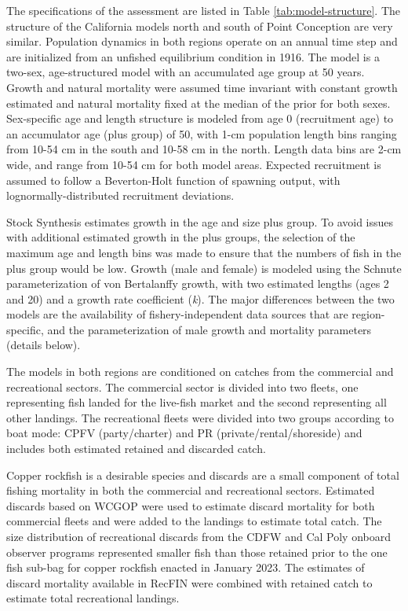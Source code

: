 \documentclass[11pt,
  letterpaper,
]{article}
\begin{document}
The specifications of the assessment are listed in Table \ref{tab:model-structure}. The structure of the California models north and south of Point Conception are very similar. Population dynamics in both regions operate on an annual time step and are initialized from an unfished equilibrium condition in 1916. The model is a two-sex, age-structured model with an accumulated age group at 50 years. Growth and natural mortality were assumed time invariant with constant growth estimated and natural mortality fixed at the median of the prior for both sexes. Sex-specific age and length structure is modeled from age 0 (recruitment age) to an accumulator age (plus group) of 50, with 1-cm population length bins ranging from 10-54 cm in the south and 10-58 cm in the north. Length data bins are 2-cm wide, and range from 10-54 cm for both model areas. Expected recruitment is assumed to follow a Beverton-Holt function of spawning output, with lognormally-distributed recruitment deviations.

Stock Synthesis estimates growth in the age and size plus group. To avoid issues with additional estimated growth in the plus groups, the selection of the maximum age and length bins was made to ensure that the numbers of fish in the plus group would be low. Growth (male and female) is modeled using the Schnute parameterization of von Bertalanffy growth, with two estimated lengths (ages 2 and 20) and a growth rate coefficient (\emph{k}). The major differences between the two models are the availability of fishery-independent data sources that are region-specific, and the parameterization of male growth and mortality parameters (details below).

The models in both regions are conditioned on catches from the commercial and recreational sectors. The commercial sector is divided into two fleets, one representing fish landed for the live-fish market and the second representing all other landings. The recreational fleets were divided into two groups according to boat mode: CPFV (party/charter) and PR (private/rental/shoreside) and includes both estimated retained and discarded catch.

Copper rockfish is a desirable species and discards are a small component of total fishing mortality in both the commercial and recreational sectors. Estimated discards based on WCGOP were used to estimate discard mortality for both commercial fleets and were added to the landings to estimate total catch. The size distribution of recreational discards from the CDFW and Cal Poly onboard observer programs represented smaller fish than those retained prior to the one fish sub-bag for copper rockfish enacted in January 2023. The estimates of discard mortality available in RecFIN were combined with retained catch to estimate total recreational landings.
\end{document}

